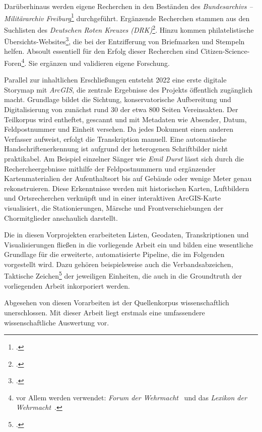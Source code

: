 \documentclass[12pt, a4paper, ngerman, bidi=default]{article}
\let\cite\footcite
\begin{document}
Darüberhinaus werden eigene Recherchen in den Beständen des \textit{Bundesarchivs – Militärarchiv Freiburg}\cite{hollmann_freiburg_2025} durchgeführt. Ergänzende Recherchen 
stammen aus den Suchlisten des \textit{Deutschen Roten Kreuzes (DRK)}\cite{reuter_drk_2025}. Hinzu kommen philatelistische Übersichts-Websites\cite{noauthor_feldpost_nodate}, 
die bei der Entzifferung von Briefmarken und Stempeln helfen.
Absoult essentiell für den Erfolg dieser Recherchen sind Citizen-Science-Foren\footnote{vor Allem werden verwendet: 
\textit{Forum der Wehrmacht}~\parencite{hermans_forum_nodate} und das \textit{Lexikon der Wehrmacht}~\parencite{altenburger_lexikon_nodate}.}. Sie ergänzen und validieren eigene Forschung.

Parallel zur inhaltlichen Erschließungen entsteht 2022 eine erste digitale Storymap mit \textit{ArcGIS},
die zentrale Ergebnisse des Projekts öffentlich zugänglich macht. Grundlage bildet die Sichtung, konservatorische Aufbereitung und Digitalisierung
von zunächst rund 30 der etwa 800 Seiten Vereinsakten. Der Teilkorpus wird entheftet, gescannt und mit Metadaten wie Absender, Datum,
Feldpostnummer und Einheit versehen. Da jedes Dokument einen anderen Verfasser aufweist, erfolgt die Transkription manuell. Eine automatische Handschriftenerkennung 
ist aufgrund der heterogenen Schriftbilder nicht praktikabel.
Am Beispiel einzelner Sänger wie \textit{Emil Durst} lässt sich durch die Rechercheergebnisse mithilfe der Feldpostnummern und ergänzender Kartenmaterialien der Aufenthaltsort
bis auf Gebäude oder wenige Meter genau rekonstruieren. Diese Erkenntnisse werden mit historischen Karten, Luftbildern und Ortsrecherchen verknüpft
und in einer interaktiven ArcGIS-Karte visualisiert, die Stationierungen, Märsche und Frontverschiebungen der Chormitglieder anschaulich darstellt. 

Die in diesen Vorprojekten erarbeiteten Listen, Geodaten, Transkriptionen und Visualisierungen fließen in die vorliegende Arbeit ein
und bilden eine wesentliche Grundlage für die erweiterte, automatisierte Pipeline, die im Folgenden vorgestellt wird. Dazu gehören beispielsweise auch die Verbandsabzeichen, 
Taktische Zeichen\cite[vgl][S.64-66]{haupt_buch_1982} der jeweiligen Einheiten, die auch in die Groundtruth der vorliegenden Arbeit inkorporiert werden.

Abgesehen von diesen Vorarbeiten ist der Quellenkorpus wissenschaftlich unerschlossen. Mit dieser Arbeit liegt erstmals eine
umfassendere wissenschaftliche Auswertung vor.
\end{document}
